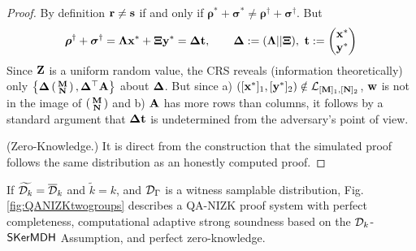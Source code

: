 \begin{proof}
By definition $\mathbf{r} \neq \mathbf{s}$  if and only if  $\boldsymbol \rho^{*}+\boldsymbol \sigma^{*} \neq 
\boldsymbol \rho^{\dagger}+ \boldsymbol \sigma^{\dagger}$.
But 
\begin{equation}
\boldsymbol \rho^{\dagger}+ \boldsymbol \sigma^{\dagger}=\mathbf{{\Lambda}}  \mathbf{x}^*+ \mathbf{{\Xi}} \mathbf{y}^*=
\mathbf{{\Delta}} \mathbf{t}, \qquad \mathbf{{\Delta}}:=(\mathbf{{\Lambda}}||\mathbf{{\Xi}}), \ \mathbf{t}:=\begin{pmatrix} \mathbf{x}^* \\ \mathbf{y}^* \end{pmatrix}
\end{equation}
Since $\mathbf{{Z}}$ is a uniform random value, the CRS reveals (information theoretically) only $\left\{\mathbf{{\Delta}}\left(\begin{smallmatrix}\mathbf{{M}}\\\mathbf{{N}}\end{smallmatrix}\right),  \mathbf{{\Delta}}^{\top}\mathbf{{A}} \right\}$ about $\mathbf{{\Delta}}$.
But since a) $([\mathbf{x}^*]_1,[\mathbf{y}^*]_2) \notin \mathcal{L}_{[\mathbf{{M}}]_1,[\mathbf{{N}}]_2}$, 
$\mathbf{w}$ is not in the image of $\left(\begin{smallmatrix}\mathbf{{M}}\\\mathbf{{N}}\end{smallmatrix}\right)$ and b) $\mathbf{{A}}$ has more rows than columns, it follows by a standard argument that $\mathbf{{\Delta}}\mathbf{t}$ is undetermined from the adversary's point of view.

(Zero-Knowledge.) It is direct from the construction that the simulated proof follows the same distribution as an honestly computed proof.
\end{proof}


\begin{theorem} If $\widetilde{\mathcal{D}_{k}}=\overline{\mathcal{D}}_k$ and $\tilde{k}=k$,  and $\mathcal{D}_{\Gamma}$ is a witness samplable distribution, Fig. \ref{fig:QANIZKtwogroups}
describes a QA-NIZK proof system with perfect completeness, computational adaptive strong soundness based on the  $\mathcal{D}_{k}$-$\mathsf{SKerMDH}$ Assumption, and perfect zero-knowledge. 
\label{theo:membtwogroups2}
\end{theorem}

